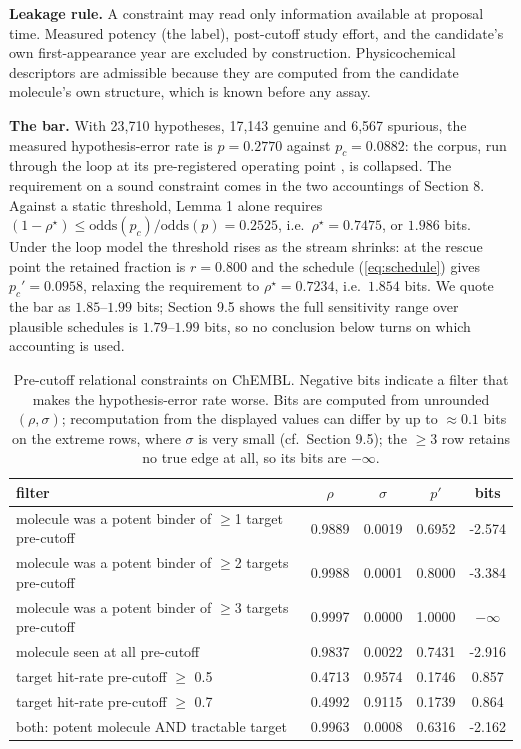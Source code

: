 \documentclass[11pt]{article}
\begin{document}
\textbf{Leakage rule.} A constraint may read only information available at
proposal time. Measured potency (the label), post-cutoff study effort, and
the candidate's own first-appearance year are excluded by construction.
Physicochemical descriptors are admissible because they are computed from
the candidate molecule's own structure, which is known before any assay.

\textbf{The bar.} With 23{,}710 hypotheses, 17{,}143 genuine and 6{,}567
spurious, the measured hypothesis-error rate is $p = 0.2770$ against
$p_c = 0.0882$: the corpus, run through the loop at its pre-registered
operating point \cite{ghosh-throughput}, is collapsed. The requirement on a
sound constraint comes in the two accountings of Section 8. Against a static
threshold, Lemma 1 alone requires $(1-\rho^\star) \leq
\mathrm{odds}(p_c)/\mathrm{odds}(p) = 0.2525$, i.e.\ $\rho^\star = 0.7475$,
or $1.986$ bits. Under the loop model the threshold rises as the stream
shrinks: at the rescue point the retained fraction is $r = 0.800$ and the
schedule (\ref{eq:schedule}) gives $p_c' = 0.0958$, relaxing the requirement
to $\rho^\star = 0.7234$, i.e.\ $1.854$ bits. We quote the bar as
$1.85$--$1.99$ bits; Section 9.5 shows the full sensitivity range over
plausible schedules is $1.79$--$1.99$ bits, so no conclusion below turns on
which accounting is used.

\begin{table}[t]
\centering
\caption{Pre-cutoff relational constraints on ChEMBL. Negative bits indicate
a filter that makes the hypothesis-error rate worse. Bits are computed from
unrounded $(\rho, \sigma)$; recomputation from the displayed values can
differ by up to $\approx 0.1$ bits on the extreme rows, where $\sigma$ is
very small (cf.\ Section 9.5); the $\geq$3 row retains no true edge at
all, so its bits are $-\infty$.}
\begin{tabular}{lcccc}
\toprule
filter & $\rho$ & $\sigma$ & $p'$ & bits \\
\midrule
molecule was a potent binder of $\geq$1 target pre-cutoff & 0.9889 & 0.0019 & 0.6952 & -2.574 \\
molecule was a potent binder of $\geq$2 targets pre-cutoff & 0.9988 & 0.0001 & 0.8000 & -3.384 \\
molecule was a potent binder of $\geq$3 targets pre-cutoff & 0.9997 & 0.0000 & 1.0000 & $-\infty$ \\
molecule seen at all pre-cutoff & 0.9837 & 0.0022 & 0.7431 & -2.916 \\
target hit-rate pre-cutoff $\geq$ 0.5 & 0.4713 & 0.9574 & 0.1746 & 0.857 \\
target hit-rate pre-cutoff $\geq$ 0.7 & 0.4992 & 0.9115 & 0.1739 & 0.864 \\
both: potent molecule AND tractable target & 0.9963 & 0.0008 & 0.6316 & -2.162 \\
\bottomrule
\end{tabular}
\end{table}
\end{document}
